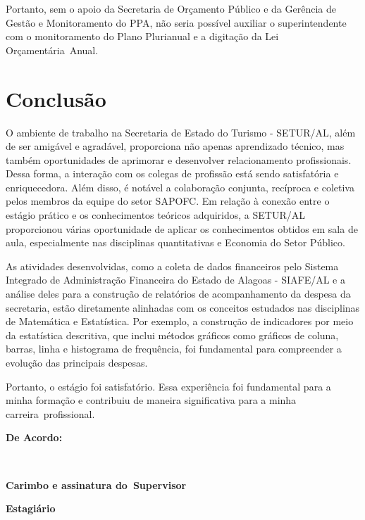 \documentclass[12pt,a4paper]{article}
\begin{document}
	Portanto, sem o apoio da Secretaria de Orçamento Público e da Gerência de Gestão e Monitoramento do PPA, não seria possível auxiliar o superintendente com o monitoramento do Plano Plurianual e a digitação da Lei Orçamentária Anual.

	\section{Conclusão}
	\hspace*{1,5cm} 
	O ambiente de trabalho na Secretaria de Estado do Turismo - SETUR/AL, além de ser amigável e agradável, proporciona não apenas aprendizado técnico, mas também oportunidades de aprimorar e desenvolver relacionamento profissionais. Dessa forma, a interação com os colegas de profissão está sendo satisfatória e enriquecedora. Além disso, é notável a colaboração conjunta, recíproca e coletiva pelos membros da equipe do setor SAPOFC. Em relação à conexão entre o estágio prático e os conhecimentos teóricos adquiridos, a SETUR/AL proporcionou várias oportunidade de aplicar os conhecimentos obtidos em sala de aula, especialmente nas disciplinas quantitativas e  Economia do Setor Público. 
	
	As atividades desenvolvidas, como a coleta de dados financeiros pelo Sistema Integrado de Administração Financeira do Estado de Alagoas - SIAFE/AL e a análise deles para a construção de relatórios de acompanhamento da despesa da secretaria, estão diretamente alinhadas com os conceitos estudados nas disciplinas de Matemática e Estatística. Por exemplo, a construção de indicadores por meio da estatística descritiva, que inclui métodos gráficos como gráficos de coluna, barras, linha e histograma de frequência, foi fundamental para compreender a evolução das principais despesas. 
	
	Portanto, o estágio foi satisfatório. Essa experiência foi fundamental para a minha formação e contribuiu de maneira significativa para a minha carreira profissional.

	

	
	\newpage
	\vspace{2cm}
	\noindent \textbf{De Acordo:}
	
	\vfill

	\noindent
	\underline{\hspace{7cm}} \hfill \underline{\hspace{7cm}} \\[0.3cm]

	\begin{minipage}[t]{7cm}
		\centering
		\textbf{Carimbo e assinatura do\
		Supervisor}
	\end{minipage}
		\hfill
	\begin{minipage}[t]{7cm}
		\centering
		\textbf{Estagiário}
	\end{minipage}

	
\end{document}
